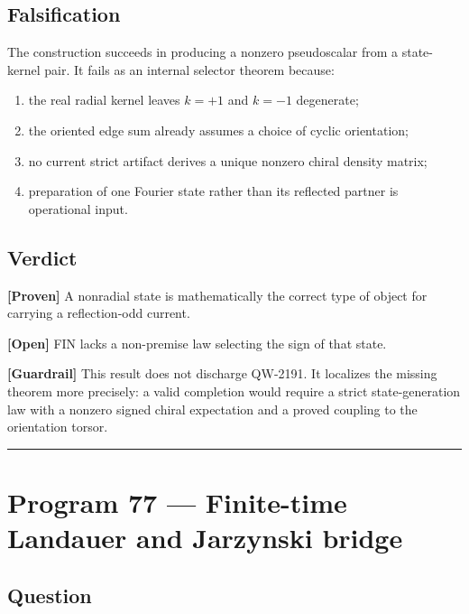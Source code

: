 \documentclass[11pt,a4paper,openany]{report}
\newcommand{\statusProven}{\textcolor{fingreen}{[Proven]}}
\newcommand{\statusOpen}{\textcolor{finviolet}{[Open]}}
\begin{document}
\section{Falsification}

The construction succeeds in producing a nonzero pseudoscalar from a state-kernel pair. It fails as an internal selector theorem because:

\begin{enumerate}
\item 
the real radial kernel leaves \(k=+1\) and \(k=-1\) degenerate;

\item 
the oriented edge sum already assumes a choice of cyclic orientation;

\item 
no current strict artifact derives a unique nonzero chiral density matrix;

\item 
preparation of one Fourier state rather than its reflected partner is operational input.

\end{enumerate}

\section{Verdict}

\textbf{\statusProven{}} A nonradial state is mathematically the correct type of object for carrying a reflection-odd current.

\textbf{\statusOpen{}} FIN lacks a non-premise law selecting the sign of that state.

\textbf{[Guardrail]} This result does not discharge QW-2191. It localizes the missing theorem more precisely: a valid completion would require a strict state-generation law with a nonzero signed chiral expectation and a proved coupling to the orientation torsor.

\par\medskip\hrule\medskip

\chapter{Program 77 --- Finite-time Landauer and Jarzynski bridge}

\section{Question}
\end{document}
